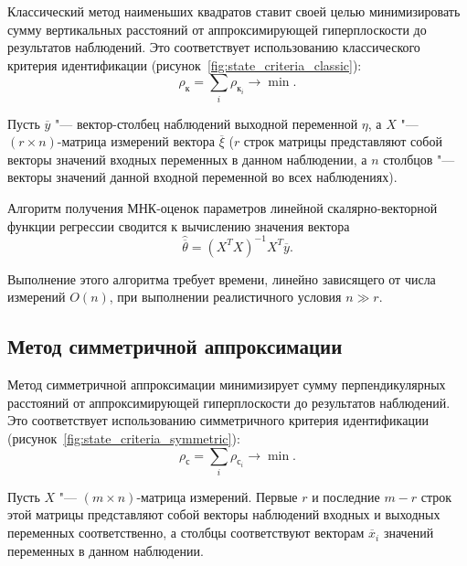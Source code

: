 Классический метод наименьших квадратов ставит своей целью минимизировать сумму
вертикальных расстояний от аппроксимирующей гиперплоскости до результатов наблюдений.
Это соответствует использованию классического критерия идентификации
(рисунок~\ref{fig:state_criteria_classic}):
\begin{equation*}
  \rho_{\text{к}} = \sum_i \rho_{\text{к}_i} \rightarrow \min.
\end{equation*}

Пусть \( \overline{y} \) "--- вектор-столбец наблюдений выходной переменной \( \eta \),
а \( X \) "--- \( (r \times n) \)-матрица измерений вектора \( \overline{\xi} \)
(\( r \) строк матрицы представляют собой векторы значений входных переменных в данном наблюдении,
а \( n \) столбцов "--- векторы значений данной входной переменной во всех наблюдениях).

Алгоритм получения МНК-оценок параметров линейной скалярно-векторной функции регрессии сводится
к вычислению значения вектора~\cite{wiki_lse}
\begin{equation*}
  \hat{\overline{\theta}} = (X^{T}X)^{-1}X^{T} \overline{y}.
\end{equation*}

Выполнение этого алгоритма требует времени, линейно зависящего от числа измерений \( O(n) \),
при выполнении реалистичного условия \( n \gg r \).

\vspace{2\baselineskip}
\subsection{Метод симметричной аппроксимации}

Метод симметричной аппроксимации минимизирует сумму перпендикулярных расстояний
от аппроксимирующей гиперплоскости до результатов наблюдений.
Это соответствует использованию симметричного критерия идентификации
(рисунок~\ref{fig:state_criteria_symmetric}):
\begin{equation*}
  \rho_{\text{с}} = \sum_i \rho_{\text{с}_i} \rightarrow \min.
\end{equation*}

Пусть \( X \) "--- \( (m \times n) \)-матрица измерений.
Первые \( r \) и последние \( m - r \) строк этой матрицы представляют собой векторы наблюдений
входных и выходных переменных соответственно,
а столбцы соответствуют векторам \( \overline{x}_i \) значений переменных в данном наблюдении.

